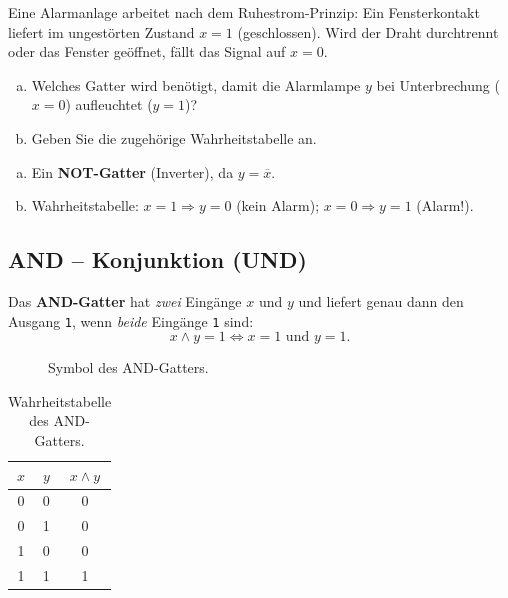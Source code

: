 \begin{myexercise}
    Eine Alarmanlage arbeitet nach dem Ruhestrom-Prinzip: Ein Fensterkontakt liefert im ungestörten Zustand $x=1$ (geschlossen). Wird der Draht durchtrennt oder das Fenster geöffnet, fällt das Signal auf $x=0$.
    \begin{enumerate}[(a)]
        \item Welches Gatter wird benötigt, damit die Alarmlampe $y$ bei Unterbrechung ($x=0$) aufleuchtet ($y=1$)?
        \item Geben Sie die zugehörige Wahrheitstabelle an.
    \end{enumerate}
    \begin{myanswer}
        \begin{enumerate}[(a)]
            \item Ein \textbf{NOT-Gatter} (Inverter), da $y = \overline{x}$.
            \item Wahrheitstabelle: $x=1 \Rightarrow y=0$ (kein Alarm); $x=0 \Rightarrow y=1$ (Alarm!).
        \end{enumerate}
    \end{myanswer}
\end{myexercise}

\subsection{AND -- Konjunktion (UND)}

\begin{mydefinition}
    Das \textbf{AND-Gatter} hat \emph{zwei} Eingänge $x$ und $y$ und liefert genau dann den Ausgang \texttt{1}, wenn \emph{beide} Eingänge \texttt{1} sind:
    \[
        x \wedge y = 1 \iff x = 1 \text{ und } y = 1.
    \]
\end{mydefinition}

\begin{figure}[H]
    \centering
    
    \caption{Symbol des AND-Gatters.}
    \label{fig:and_gatter}
\end{figure}

\begin{table}[H]
    \centering
    \begin{tabular}{ccc}
        $x$ & $y$ & $x \wedge y$ \\\midrule\midrule
        0 & 0 & 0 \\\midrule
        0 & 1 & 0 \\\midrule
        1 & 0 & 0 \\\midrule
        1 & 1 & 1 \\
    \end{tabular}
    \caption{Wahrheitstabelle des AND-Gatters.}
    \label{tab:and}
\end{table}


